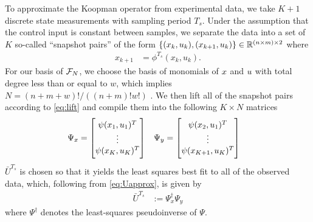 

To approximate the Koopman operator from experimental data, we take $K+1$ discrete state measurements with sampling period $T_s$. Under the assumption that the control input is constant between samples, we separate the data into a set of $K$ so-called ``snapshot pairs'' of the form ${ \{(x_k,u_k),(x_{k+1},u_k)\} \in \mathbb{R}^{(n \times m) \times 2} }$ where
\begin{align}
    x_{k+1} &= \phi^{T_s} (x_k, u_k).
\end{align}
For our basis of $\mathcal{F}_N$, we choose the basis of monomials of $x$ and $u$ with total degree less than or equal to $w$, which implies $N=(n+m+w)!/\left((n+m)!w!\right)$ \cite[]{mauroy2016linear}. 
We then lift all of the snapshot pairs according to \eqref{eq:lift} and compile them into the following $K \times N$ matrices
\begin{align}
    &\Psi_x = \begin{bmatrix}  {\psi}(x_1, u_1)^T \\ \vdots \\  {\psi}(x_K, u_K)^T \end{bmatrix}
    &&\Psi_y = \begin{bmatrix}  {\psi}(x_2, u_1)^T \\ \vdots \\  {\psi}(x_{K+1}, u_{K})^T \end{bmatrix}
\end{align}
 $\bar{U}^{T_s}$ is chosen so that it yields the least squares best fit to all of the observed data, which, following from \eqref{eq:Uapprox}, is given by 
\begin{align}
    \bar{U}^{T_s} &:= \Psi_x^\dagger \Psi_y
\end{align}
where ${\Psi}^\dagger$ denotes the least-squares pseudoinverse of ${\Psi}$.


